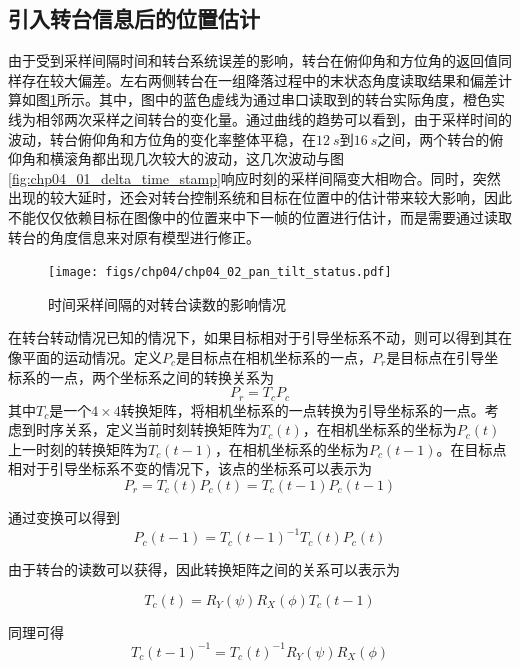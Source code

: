 \subsection{引入转台信息后的位置估计}
由于受到采样间隔时间和转台系统误差的影响，转台在俯仰角和方位角的返回值同样存在较大偏差。左右两侧转台在一组降落过程中的末状态角度读取结果和偏差计算如图\ref{fig:chp04_02_pan_tilt_status}所示。其中，图中的蓝色虚线为通过串口读取到的转台实际角度，橙色实线为相邻两次采样之间转台的变化量。通过曲线的趋势可以看到，由于采样时间的波动，转台俯仰角和方位角的变化率整体平稳，在$12\ s$到$16\ s$之间，两个转台的俯仰角和横滚角都出现几次较大的波动，这几次波动与图\ref{fig:chp04_01_delta_time_stamp}响应时刻的采样间隔变大相吻合。同时，突然出现的较大延时，还会对转台控制系统和目标在位置中的估计带来较大影响，因此不能仅仅依赖目标在图像中的位置来中下一帧的位置进行估计，而是需要通过读取转台的角度信息来对原有模型进行修正。
\begin{figure}[ht]   
	\centering
	\texttt{[image: figs/chp04/chp04\_02\_pan\_tilt\_status.pdf]}
	\caption{时间采样间隔的对转台读数的影响情况}
	\label{fig:chp04_02_pan_tilt_status}
\end{figure}

在转台转动情况已知的情况下，如果目标相对于引导坐标系不动，则可以得到其在像平面的运动情况。定义$P_c$是目标点在相机坐标系的一点，$P_r$是目标点在引导坐标系的一点，两个坐标系之间的转换关系为
\begin{equation}
P_r = T_c P_c
\end{equation}
其中$T_c$是一个$4 \times 4$转换矩阵，将相机坐标系的一点转换为引导坐标系的一点。考虑到时序关系，定义当前时刻转换矩阵为$T_c(t)$，在相机坐标系的坐标为$P_c(t)$ 上一时刻的转换矩阵为$T_c(t-1)$，在相机坐标系的坐标为$P_c(t-1)$。在目标点相对于引导坐标系不变的情况下，该点的坐标系可以表示为
\begin{equation}
P_r = T_c(t) P_c(t) =T_c(t-1) P_c(t-1)
\end{equation}

通过变换可以得到
\begin{equation}
\label{eq:chp04_predict_position}
P_c(t-1) = T_c(t-1)^{-1}T_c(t) P_c(t)
\end{equation}

由于转台的读数可以获得，因此转换矩阵之间的关系可以表示为

\begin{equation}
T_c(t) = R_Y(\psi)R_X(\phi)T_c(t-1)
\end{equation}

同理可得
\begin{equation}
T_c(t-1)^{-1} = T_c(t)^{-1}R_Y(\psi)R_X(\phi)
\end{equation}

